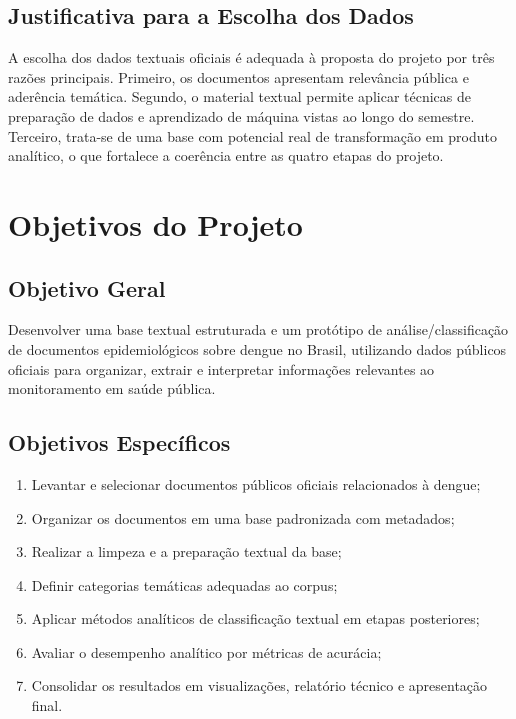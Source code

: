 \documentclass[12pt,a4paper]{article}
\begin{document}
\subsection{Justificativa para a Escolha dos Dados}

A escolha dos dados textuais oficiais é adequada à proposta do projeto por três razões principais. Primeiro, os documentos apresentam relevância pública e aderência temática. Segundo, o material textual permite aplicar técnicas de preparação de dados e aprendizado de máquina vistas ao longo do semestre. Terceiro, trata-se de uma base com potencial real de transformação em produto analítico, o que fortalece a coerência entre as quatro etapas do projeto.

\clearpage
\section{Objetivos do Projeto}

\subsection{Objetivo Geral}

Desenvolver uma base textual estruturada e um protótipo de análise/classificação de documentos epidemiológicos sobre dengue no Brasil, utilizando dados públicos oficiais para organizar, extrair e interpretar informações relevantes ao monitoramento em saúde pública.

\subsection{Objetivos Específicos}

\begin{enumerate}[leftmargin=1.2cm]
    \item Levantar e selecionar documentos públicos oficiais relacionados à dengue;
    \item Organizar os documentos em uma base padronizada com metadados;
    \item Realizar a limpeza e a preparação textual da base;
    \item Definir categorias temáticas adequadas ao corpus;
    \item Aplicar métodos analíticos de classificação textual em etapas posteriores;
    \item Avaliar o desempenho analítico por métricas de acurácia;
    \item Consolidar os resultados em visualizações, relatório técnico e apresentação final.
\end{enumerate}
\end{document}
